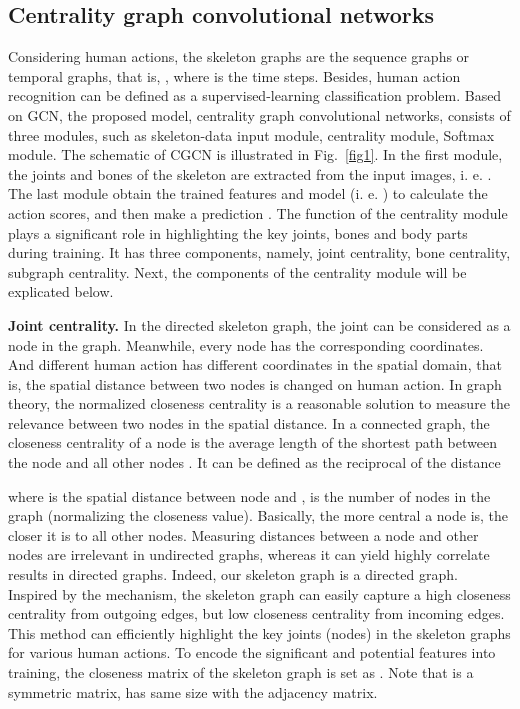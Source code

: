 \documentclass[runningheads]{llncs}
\begin{document}
\subsection{Centrality graph convolutional networks}
Considering human actions, the skeleton graphs are the sequence graphs or temporal graphs, that is, , where  is the time steps. Besides, human action recognition can be defined as a supervised-learning classification problem. Based on GCN, the proposed model, centrality graph convolutional networks, consists of three modules, such as skeleton-data input module, centrality module, Softmax module. The schematic of CGCN is illustrated in Fig.~\ref{fig1}. In the first module, the joints and bones of the skeleton are extracted from the input images, i. e.  . The last module obtain the trained features and model (i. e. ) to calculate the action scores, and then make a prediction \cite{yan2018spatial}. The function of the centrality module plays a significant role in highlighting the key joints, bones and body parts during training. It has three components, namely, joint centrality, bone centrality, subgraph centrality. Next, the components of the centrality module will be explicated below.

\textbf{Joint centrality.} In the directed skeleton graph, the joint can be considered as a node in the graph. Meanwhile, every node has the corresponding coordinates. And different human action has different coordinates in the spatial domain, that is, the spatial distance between two nodes is changed on human action. In graph theory, the normalized closeness centrality is a reasonable solution to measure the relevance between two nodes in the spatial distance. In a connected graph, the closeness centrality of a node is the average length of the shortest path between the node and all other nodes \cite{bavelas1950communication}. It can be defined as the reciprocal of the distance

where  is the spatial distance between node  and ,  is the number of nodes in the graph (normalizing the closeness value). Basically, the more central a node is, the closer it is to all other nodes. Measuring distances between a node and other nodes are irrelevant in undirected graphs, whereas it can yield highly correlate results in directed graphs. Indeed, our skeleton graph is a directed graph. Inspired by the mechanism, the skeleton graph can easily capture a high closeness centrality from outgoing edges, but low closeness centrality from incoming edges. This method can efficiently highlight the key joints (nodes) in the skeleton graphs for various human actions. To encode the significant and potential features into training, the closeness matrix of the skeleton graph is set as . Note that  is a symmetric matrix, has same size with the adjacency matrix.
\end{document}
